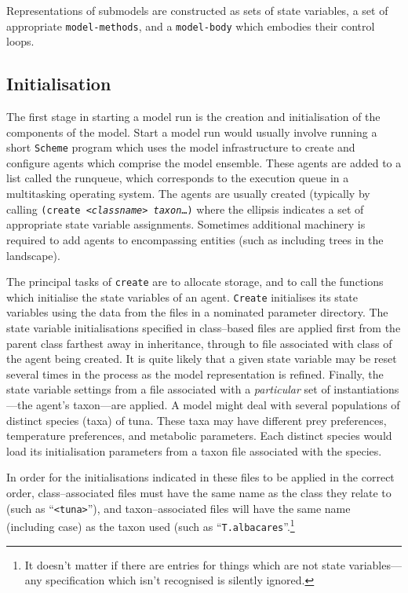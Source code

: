 Representations of submodels are constructed as sets of state
variables, a set of appropriate \texttt{model-methods}, and a
\texttt{model-body} which embodies their control loops. 

\subsection{Initialisation}

The first stage in starting a model run is the creation and
initialisation of the components of the model. Start a model run would
usually involve running a short \texttt{Scheme} program which uses the
model infrastructure to create and configure agents which comprise the
model ensemble.  These agents are added to a list called the runqueue,
which corresponds to the execution queue in a multitasking operating
system. The agents are usually created (typically by calling \texttt{(create
  \textit{<classname> \textit{taxon}}\/\ldots)} where the ellipsis indicates
a set of appropriate state variable assignments.  Sometimes additional
machinery is required to add agents to encompassing entities (such as
including trees in the landscape).

The principal tasks of \texttt{create} are to allocate storage, and to
call the functions which initialise the state variables of an agent.
\texttt{Create} initialises its state variables using the data from
the files in a nominated parameter directory. The state variable
initialisations specified in class--based files are applied first from
the parent class farthest away in inheritance, through to file
associated with class of the agent being created. It is quite likely
that a given state variable may be reset several times in the process
as the model representation is refined. Finally, the state variable
settings from a file associated with a \emph{particular}\/ set of
instantiations---the agent's taxon---are applied.  A model might deal
with several populations of distinct species (taxa) of tuna.
These taxa may have different prey preferences, temperature preferences, and
metabolic parameters.  Each distinct species would load its
initialisation parameters from a taxon file associated with the
species.

In order for the initialisations indicated in these files to be
applied in the correct order, class--associated files must have the
same name as the class they relate to (such as ``\texttt{<tuna>}''),
and taxon--associated files will have the same name (including case)
as the taxon used (such as ``\texttt{T.albacares}''.\footnote{It
  doesn't matter if there are entries for things which are not state
  variables---any specification which isn't recognised is silently
  ignored.}

